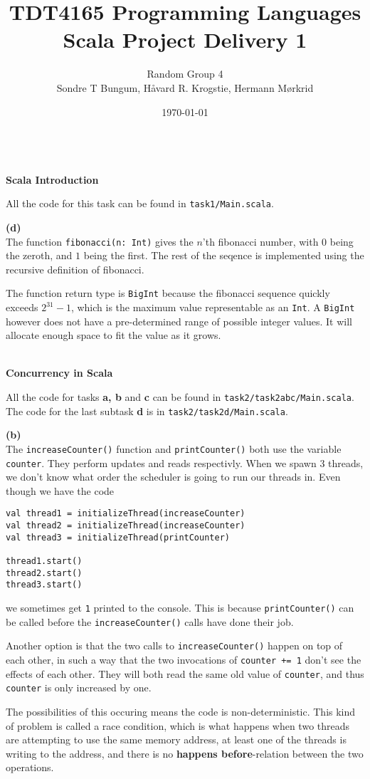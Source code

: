 \documentclass[12pt]{article}
\title{TDT4165 Programming Languages\\Scala Project Delivery 1}
\author{\small{Random Group 4}\\ \small{Sondre T Bungum, Håvard R. Krogstie, Hermann Mørkrid}}
\date{\today}
\newcommand{\task}[1]{\vspace*{5mm}\hspace*{-2cm}\fbox{#1}\\[-5mm]}
\newcommand{\subtask}[1]{\hspace*{-1cm}\textbf{(#1)}\\[-5mm]}
\begin{document}
\maketitle

\task{1}
\textbf{Scala Introduction}

All the code for this task can be found in \verb|task1/Main.scala|.

\subtask{d}
The function \verb|fibonacci(n: Int)| gives the $n$'th fibonacci number,
with $0$ being the zeroth, and $1$ being the first. The rest of the seqence
is implemented using the recursive definition of fibonacci.

The function return type is \verb|BigInt| because the fibonacci sequence
quickly exceeds $2^{31}-1$, which is the maximum value representable as an \verb|Int|.
A \verb|BigInt| however does not have a pre-determined range of possible integer values.
It will allocate enough space to fit the value as it grows.

\task{2}
\textbf{Concurrency in Scala}

All the code for tasks \textbf{a, b} and \textbf{c} can be found in \verb|task2/task2abc/Main.scala|.
The code for the last subtask \textbf{d} is in \verb|task2/task2d/Main.scala|.

\subtask{b}
The \verb|increaseCounter()| function and \verb|printCounter()| both use the variable \verb|counter|.
They perform updates and reads respectivly. When we spawn 3 threads, we don't know what order
the scheduler is going to run our threads in. Even though we have the code
%
\begin{verbatim}
val thread1 = initializeThread(increaseCounter)
val thread2 = initializeThread(increaseCounter)
val thread3 = initializeThread(printCounter)

thread1.start()
thread2.start()
thread3.start()
\end{verbatim}
%
we sometimes get \verb|1| printed to the console. This is because \verb|printCounter()|
can be called before the \verb|increaseCounter()| calls have done their job.

Another option is that the two calls to \verb|increaseCounter()| happen on top of each other,
in such a way that the two invocations of \verb|counter += 1| don't see the effects of each other.
They will both read the same old value of \verb|counter|, and thus \verb|counter| is only increased by one.

The possibilities of this occuring means the code is non-deterministic.
This kind of problem is called a race condition, which is what happens when
two threads are attempting to use the same memory address,
at least one of the threads is writing to the address,
and there is no \textbf{happens before}-relation between the two operations.
\end{document}
